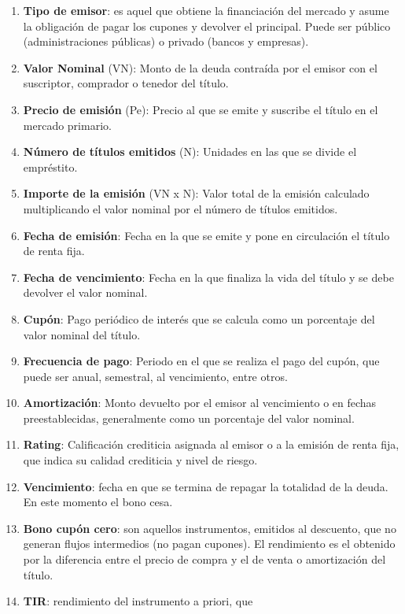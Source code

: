 \documentclass[
  letterpaper,
  DIV=11,
  numbers=noendperiod]{scrartcl}
\begin{document}
\begin{enumerate}
\def\labelenumi{\arabic{enumi}.}
\item
  \textbf{Tipo de emisor}: es aquel que obtiene la financiación del
  mercado y asume la obligación de pagar los cupones y devolver el
  principal. Puede ser público (administraciones públicas) o privado
  (bancos y empresas).
\item
  \textbf{Valor Nominal} (VN): Monto de la deuda contraída por el emisor
  con el suscriptor, comprador o tenedor del título.
\item
  \textbf{Precio de emisión} (Pe): Precio al que se emite y suscribe el
  título en el mercado primario.
\item
  \textbf{Número de títulos emitidos} (N): Unidades en las que se divide
  el empréstito.
\item
  \textbf{Importe de la emisión} (VN x N): Valor total de la emisión
  calculado multiplicando el valor nominal por el número de títulos
  emitidos.
\item
  \textbf{Fecha de emisión}: Fecha en la que se emite y pone en
  circulación el título de renta fija.
\item
  \textbf{Fecha de vencimiento}: Fecha en la que finaliza la vida del
  título y se debe devolver el valor nominal.
\item
  \textbf{Cupón}: Pago periódico de interés que se calcula como un
  porcentaje del valor nominal del título.
\item
  \textbf{Frecuencia de pago}: Periodo en el que se realiza el pago del
  cupón, que puede ser anual, semestral, al vencimiento, entre otros.
\item
  \textbf{Amortización}: Monto devuelto por el emisor al vencimiento o
  en fechas preestablecidas, generalmente como un porcentaje del valor
  nominal.
\item
  \textbf{Rating}: Calificación crediticia asignada al emisor o a la
  emisión de renta fija, que indica su calidad crediticia y nivel de
  riesgo.
\item
  \textbf{Vencimiento}: fecha en que se termina de repagar la totalidad
  de la deuda. En este momento el bono cesa.
\item
  \textbf{Bono cupón cero}: son aquellos instrumentos, emitidos al
  descuento, que no generan flujos intermedios (no pagan cupones). El
  rendimiento es el obtenido por la diferencia entre el precio de compra
  y el de venta o amortización del título.
\item
  \textbf{TIR}: rendimiento del instrumento a priori, que

\end{enumerate}
\end{document}
